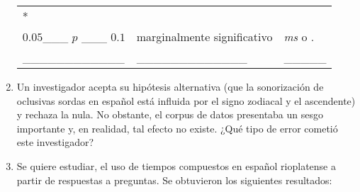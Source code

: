 \documentclass[12pt,spanish,a4paper,]{article}
\begin{document}
\begin{enumerate}
\begin{longtable}[]{@{}lll@{}}
\begin{minipage}[t]{0.15\columnwidth}
  *\strut
  \end{minipage}\tabularnewline
  \begin{minipage}[t]{0.40\columnwidth}\raggedright
  \(0.05\)\_\_\_ \(p\) \_\_\_ \(0.1\)\strut
  \end{minipage} & \begin{minipage}[t]{0.36\columnwidth}\raggedright
  marginalmente significativo\strut
  \end{minipage} & \begin{minipage}[t]{0.15\columnwidth}\raggedright
  \emph{ms} o .\strut
  \end{minipage}\tabularnewline
  \begin{minipage}[t]{0.40\columnwidth}\raggedright
  \_\_\_\_\_\_\_\_\_\_\_\_\strut
  \end{minipage} & \begin{minipage}[t]{0.36\columnwidth}\raggedright
  \_\_\_\_\_\_\_\_\_\_\_\_\_\strut
  \end{minipage} & \begin{minipage}[t]{0.15\columnwidth}\raggedright
  \_\_\_\_\_\strut
  \end{minipage}\tabularnewline
  \bottomrule
  \end{longtable}
\item
  Un investigador acepta su hipótesis alternativa (que la sonorización
  de oclusivas sordas en español está influida por el signo zodiacal y
  el ascendente) y rechaza la nula. No obstante, el corpus de datos
  presentaba un sesgo importante y, en realidad, tal efecto no existe.
  ¿Qué tipo de error cometió este investigador?
\item
  Se quiere estudiar, el uso de tiempos compuestos en español
  rioplatense a partir de respuestas a preguntas. Se obtuvieron los
  siguientes resultados:


\end{enumerate}
\end{document}
